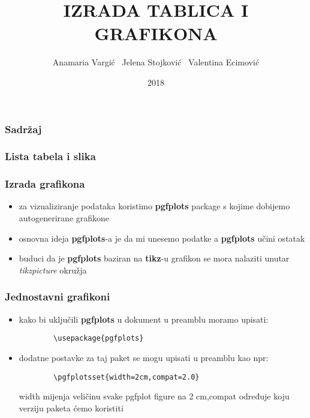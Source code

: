 \documentclass[16pt]{beamer}
\title[IZRADA TABLICA I GRAFIKONA\hspace{20mm} \insertframenumber/\inserttotalframenumber]{IZRADA TABLICA I GRAFIKONA}
\author{Anamaria Vargić \  Jelena Stojković  \  Valentina Ecimović}
\institute{Tehnički fakultet u Rijeci - Računarstvo}
\date{2018}
\begin{document}
\frame{\titlepage}
\begin{frame}

\frametitle{Sadržaj}

\tableofcontents

\end{frame}
\begin{frame}
\frametitle{Lista tabela i slika}


\listoffigures
 
\listoftables
 
\newpage
 
\end{frame} 

\begin{frame}

\frametitle{Izrada grafikona}

\begin{itemize}
\setlength\itemsep{2em}

\item za vizualiziranje podataka koristimo \textbf{pgfplots} package s kojime dobijemo autogenerirane grafikone
\item osnovna ideja \textbf{pgfplots}-a je da mi unesemo podatke a \textbf{pgfplots} učini ostatak
\item buduci da je \textbf{pgfplots} baziran na \textbf{tikz}-u grafikon se mora nalaziti unutar \textit{tikzpicture} okružja

\end{itemize}

\end{frame}
\begin{frame}[fragile]
\frametitle{Jednostavni grafikoni}

\begin{itemize}
\setlength\itemsep{1em}

\item kako bi uključili \textbf{pgfplots} u dokument u preamblu moramo upisati:
	\begin{verbatim}
		\usepackage{pgfplots}
	\end{verbatim}
\item dodatne postavke za taj paket se mogu upisati u preamblu kao npr:
	\begin{verbatim}
		\pgfplotsset{width=2cm,compat=2.0}
	\end{verbatim}
	width mijenja veličinu svake pgfplot figure na 2 cm,compat određuje koju verziju paketa ćemo koristiti
		
	
\end{itemize}

\end{frame}
\end{document}
